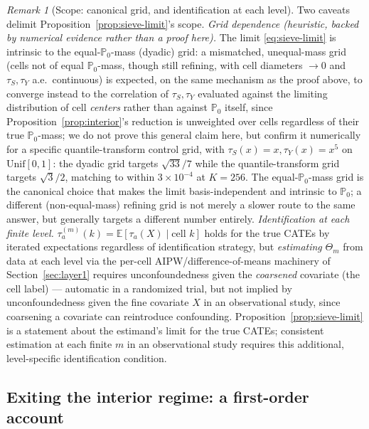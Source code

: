 \documentclass[11pt]{article}
\theoremstyle{plain}
\theoremstyle{definition}
\theoremstyle{remark}
\newtheorem{remark}[theorem]{Remark}
\newcommand{\E}{\mathbb{E}}
\newcommand{\PP}{\mathbb{P}}
\begin{document}
\begin{remark}[Scope: canonical grid, and identification at each level]\label{rem:sieve-scope}
Two caveats delimit Proposition~\ref{prop:sieve-limit}'s scope. \emph{Grid
dependence (heuristic, backed by numerical evidence rather than a proof here).} The
limit \eqref{eq:sieve-limit} is intrinsic to the equal-$\PP_0$-mass (dyadic) grid: a
mismatched, unequal-mass grid (cells not of equal $\PP_0$-mass, though still
refining, with cell diameters $\to0$ and $\tau_S,\tau_Y$ a.e.\ continuous) is
expected, on the same mechanism as the proof above, to converge instead to the
correlation of $\tau_S,\tau_Y$ evaluated against the limiting distribution of cell
\emph{centers} rather than against $\PP_0$ itself, since Proposition~\ref{prop:interior}'s
reduction is unweighted over cells regardless of their true $\PP_0$-mass; we do not
prove this general claim here, but confirm it numerically for a specific
quantile-transform control grid, with $\tau_S(x)=x,\tau_Y(x)=x^5$ on
$\mathrm{Unif}[0,1]$: the dyadic grid targets $\sqrt{33}/7$ while the
quantile-transform grid targets $\sqrt3/2$, matching to within $3\times10^{-4}$ at
$K=256$. The equal-$\PP_0$-mass grid is the canonical choice
that makes the limit basis-independent and intrinsic to $\PP_0$; a different
(non-equal-mass) refining grid is not merely a slower route to the same answer, but
generally targets a different number entirely. \emph{Identification at each finite
level.} $\tau_a^{(m)}(k)=\E[\tau_a(X)\mid\text{cell }k]$
holds for the true CATEs by iterated expectations regardless of identification
strategy, but \emph{estimating} $\Theta_m$ from data at each level via the per-cell
AIPW/difference-of-means machinery of Section~\ref{sec:layer1} requires
unconfoundedness given the \emph{coarsened} covariate (the cell label) --- automatic
in a randomized trial, but not implied by unconfoundedness given the fine covariate
$X$ in an observational study, since coarsening a covariate can reintroduce
confounding. Proposition~\ref{prop:sieve-limit} is a statement about the estimand's
limit for the true CATEs; consistent estimation at each finite $m$ in an
observational study requires this additional, level-specific identification
condition.
\end{remark}

\subsection{Exiting the interior regime: a first-order account}\label{sec:exit-interior}
\end{document}
